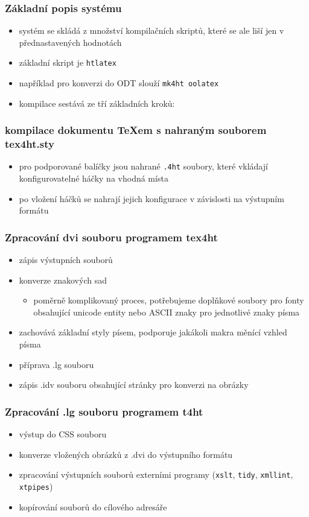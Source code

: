 \documentclass[czech]{beamer}
\begin{document}
\begin{frame}

  \frametitle{Základní popis systému}
  \begin{itemize}
    \item systém se skládá z množství kompilačních skriptů, které se ale liší
      jen v přednastavených hodnotách
  \item základní skript je \texttt{htlatex} 
  \item například pro konverzi do ODT slouží \texttt{mk4ht oolatex}
  \item kompilace sestává ze tří základních kroků:
\end{itemize}
\end{frame}
\begin{frame}
  \frametitle{kompilace dokumentu TeXem s nahraným souborem tex4ht.sty}
  \begin{itemize}
    \item pro podporované balíčky jsou nahrané \texttt{.4ht} soubory, které vkládají
        konfigurovatelné háčky na vhodná místa
    \item po vložení háčků se nahrají jejich konfigurace v závislosti na
        výstupním formátu
  \end{itemize}
\end{frame}
\begin{frame}
  \frametitle{Zpracování dvi souboru programem tex4ht}
  \begin{itemize}
    \item   zápis výstupních souborů
    \item   konverze znakových sad
      \begin{itemize} 
        \item  poměrně komplikovaný proces, potřebujeme
          doplňkové soubory pro fonty obsahující unicode entity nebo ASCII
          znaky pro jednotlivé znaky písma
  \end{itemize}
    \item   zachovává základní styly písem, podporuje jakákoli makra měnící vzhled písma
    \item   příprava .lg souboru
    \item   zápis .idv souboru obsahující stránky pro konverzi na obrázky
  \end{itemize}
\end{frame}
\begin{frame}
  \frametitle{Zpracování .lg souboru programem t4ht}
  \begin{itemize}
    \item   výstup do CSS souboru
    \item   konverze vložených obrázků z .dvi do výstupního formátu
    \item   zpracování výstupních souborů externími programy 
    (\texttt{xslt}, \texttt{tidy}, \texttt{xmllint}, \texttt{xtpipes})
    \item   kopírování souborů do cílového adresáře
  \end{itemize}
\end{frame}
\end{document}
